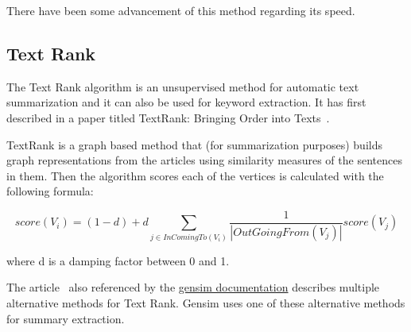 {There have been some advancement of this method regarding its speed\cite{GreedySum}.

\subsection{Text Rank}

The Text Rank algorithm is an unsupervised method for automatic text summarization and it can also be used for keyword extraction. It has first described in a paper titled TextRank: Bringing Order into Texts~\cite{TextRank:2004}.

TextRank is a graph based method that (for summarization purposes) builds graph representations from the articles using similarity measures of the sentences in them. Then the algorithm scores each of the vertices is calculated with the following formula:

\[score(V_i) = (1 - d) + d \sum_{j \in InComingTo(V_i)} \frac{1}{|OutGoingFrom(V_j)|} score(V_j)\]

where d is a damping factor between 0 and 1.

The article~\cite{TextRank} also referenced by the \href{https://radimrehurek.com/gensim/summarization/summariser.html}{gensim documentation} describes multiple alternative methods for Text Rank. Gensim uses one of these alternative methods for summary extraction.  

}
